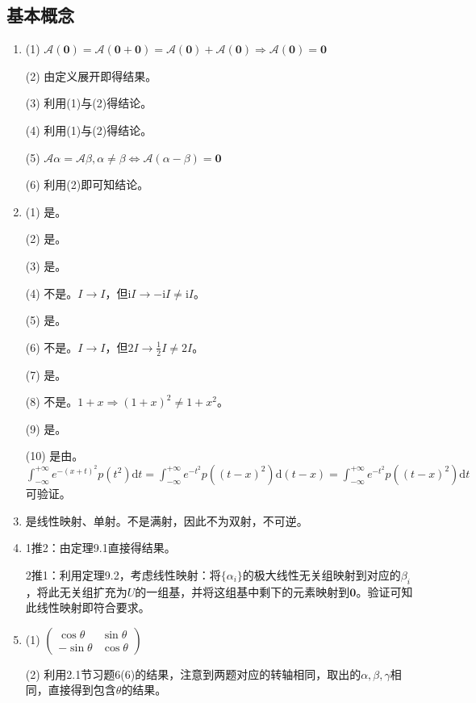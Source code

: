 \documentclass[a4paper,UTF8,fontset=windows]{ctexart}
\begin{document}
\subsection{基本概念}
\begin{enumerate}
\item
(1) $\mathcal{A}(\mathbf{0})=\mathcal{A}(\mathbf{0}+\mathbf{0})=\mathcal{A}(\mathbf{0})+\mathcal{A}(\mathbf{0})\Rightarrow\mathcal{A}(\mathbf{0})=\mathbf{0}$

(2) 由定义展开即得结果。

(3) 利用(1)与(2)得结论。

(4) 利用(1)与(2)得结论。

(5) $\mathcal{A}\alpha=\mathcal{A}\beta,\alpha\ne\beta\Leftrightarrow\mathcal{A}(\alpha-\beta)=\mathbf{0}$

(6) 利用(2)即可知结论。

\item
(1) 是。

(2) 是。

(3) 是。

(4) 不是。$I\rightarrow I$，但$\mathrm{i}I\rightarrow-\mathrm{i}I\ne\mathrm{i}I$。

(5) 是。

(6) 不是。$I\rightarrow I$，但$2I\rightarrow\frac{1}{2}I\ne2I$。

(7) 是。

(8) 不是。$1+x\Rightarrow(1+x)^2\ne1+x^2$。

(9) 是。

(10) 是由。$\int_{-\infty}^{+\infty}e^{-(x+t)^2}p(t^2)\mathrm{d}t=\int_{-\infty}^{+\infty}e^{-t^2}p((t-x)^2)\mathrm{d}(t-x)=\int_{-\infty}^{+\infty}e^{-t^2}p((t-x)^2)\mathrm{d}t$可验证。

\item
是线性映射、单射。不是满射，因此不为双射，不可逆。

\item
1推2：由定理9.1直接得结果。

2推1：利用定理9.2，考虑线性映射：将$\{\alpha_i\}$的极大线性无关组映射到对应的$\beta_i$，将此无关组扩充为$U$的一组基，并将这组基中剩下的元素映射到$\mathbf{0}$。验证可知此线性映射即符合要求。

\item
(1) $\begin{pmatrix}\cos\theta&\sin\theta\\-\sin\theta&\cos\theta\end{pmatrix}$

(2) 利用2.1节习题6(6)的结果，注意到两题对应的转轴相同，取出的$\alpha,\beta,\gamma$相同，直接得到包含$\theta$的结果。


\end{enumerate}
\end{document}
